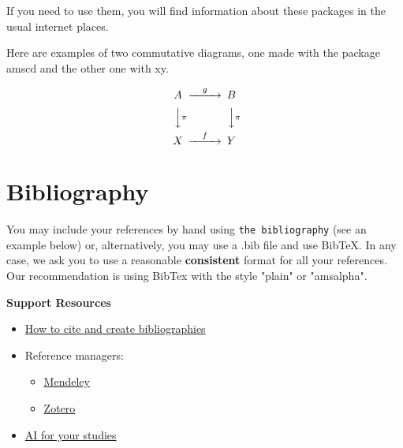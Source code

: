 \documentclass[12,twoside]{MESIOTFM}
\theoremstyle{definition}
\theoremstyle{remark}
\begin{document}
If you need to use them, you will find information about these packages in the usual internet places. 

Here are examples of two commutative diagrams, one made with the package amscd and the other one with xy.

\[
\begin{CD}
A @>g>> B\\
@VV\pi V @VV\pi V\\
X @>f>> Y
\end{CD}
\]

\cleardoublepage

\section{Bibliography}

You may include your references by hand using {\tt the bibliography} (see an example below) or, alternatively, you may use a .bib file and use BibTeX. In any case, we ask you to use a reasonable {\bf consistent} format for all your references. Our recommendation is using BibTex with the style   "plain" or "amsalpha".

{\small
\textbf{Support Resources}
\begin{itemize}
    \item \href{https://guies-bibliotecnica-upc-edu.translate.goog/com-citar?_x_tr_sl=ca&_x_tr_tl=en&_x_tr_hl=ca&_x_tr_pto=wapp}{How to cite and create bibliographies}
    \item Reference managers:
    \begin{itemize}
        \item \href{https://guies-bibliotecnica-upc-edu.translate.goog/Mendeley?_x_tr_sl=ca&_x_tr_tl=en&_x_tr_hl=ca&_x_tr_pto=wapp}{Mendeley}
        \item \href{https://guies-bibliotecnica-upc-edu.translate.goog/Zotero?_x_tr_sl=ca&_x_tr_tl=en&_x_tr_hl=ca&_x_tr_pto=wapp}{Zotero}
    \end{itemize}
    \item \href{https://guies-bibliotecnica-upc-edu.translate.goog/intelligencia-artificial/estudis?_x_tr_sl=ca&_x_tr_tl=en&_x_tr_hl=ca&_x_tr_pto=wapp}{AI for your studies}
\end{itemize}
}

\end{document}
